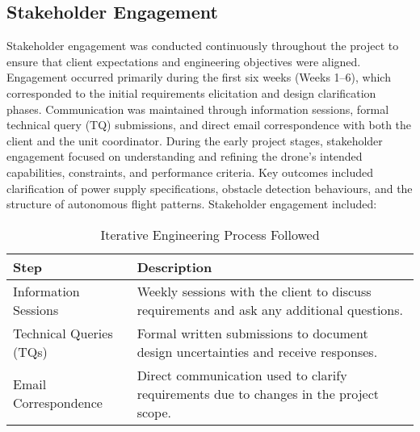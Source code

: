 \subsection{Stakeholder Engagement}
Stakeholder engagement was conducted continuously throughout the project to ensure that client expectations and engineering objectives were aligned. Engagement occurred primarily during the first six weeks (Weeks 1–6), which corresponded to the initial requirements elicitation and design clarification phases. Communication was maintained through information sessions, formal technical query (TQ) submissions, and direct email correspondence with both the client and the unit coordinator. During the early project stages, stakeholder engagement focused on understanding and refining the drone’s intended capabilities, constraints, and performance criteria. Key outcomes included clarification of power supply specifications, obstacle detection behaviours, and the structure of autonomous flight patterns. Stakeholder engagement included:

\begin{table}[H]
\centering
\caption{Iterative Engineering Process Followed}
\begin{tabular}{|p{3cm}|p{10cm}|}
\hline
\textbf{Step} & \textbf{Description} \\ \hline
Information Sessions & Weekly sessions with the client to discuss requirements and ask any additional questions. \\ \hline
Technical Queries (TQs) & Formal written submissions to document design uncertainties and receive responses. \\ \hline
Email Correspondence & Direct communication used to clarify requirements due to changes in the project scope. \\ \hline
\end{tabular}
\end{table}




